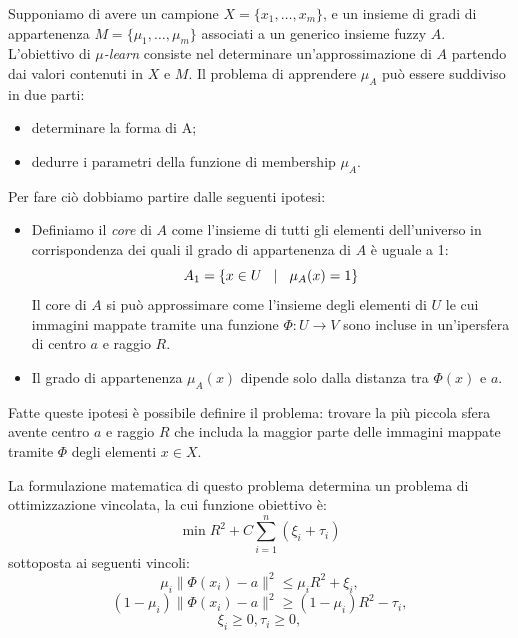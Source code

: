 \documentclass[a4paper,12pt]{report}
\begin{document}
Supponiamo di avere un campione $X = \{x_1,\dots,x_m\}$, e un insieme di gradi di appartenenza $ M = \{\mu_1,\dots,\mu_m\}$ associati a un generico insieme fuzzy $A$. L'obiettivo di \textit{$\mu$-learn} consiste nel determinare un'approssimazione di $A$ partendo dai valori contenuti in $X$ e $M$.
Il problema di apprendere $\mu_A$ può essere suddiviso in due parti:
\begin{itemize}
    \item determinare la forma di A;
    \item dedurre i parametri della funzione di membership $\mu_A$.
\end{itemize}

\noindent Per fare ciò dobbiamo partire dalle seguenti ipotesi:
\begin{itemize}
    \item  Definiamo il \textit{core} di $A$ come l'insieme di tutti gli elementi dell'universo in corrispondenza dei quali il grado di appartenenza di $A$ è uguale a 1:
    \begin{equation}
        A_1 = \{ x\in U \hspace{0,3cm} |\hspace{0,3cm} \mu_A(x) = 1 \}
    \end{equation}
    \noindent Il core di $A$ si può approssimare come l'insieme degli elementi di $U$ le cui immagini mappate tramite una funzione $\Phi: U \to V$ sono incluse in un'ipersfera di centro $a$ e raggio $R$.

    \item Il grado di appartenenza $\mu_A(x)$ dipende solo dalla distanza tra $\Phi(x)$ e $a$.
\end{itemize}

\noindent Fatte queste ipotesi è possibile definire il problema: trovare la più piccola sfera avente centro $a$ e raggio $R$ che includa la maggior parte delle immagini mappate tramite $\Phi$ degli elementi $x\in X$.



La formulazione matematica di questo problema determina un problema di ottimizzazione vincolata, la cui funzione obiettivo è:
\begin{equation}
    \min R^2 + C\displaystyle\sum_{i=1}^{n}(\xi_i+\tau_i)
    \label{eq:Problema_di_partenza}
\end{equation}
sottoposta ai seguenti vincoli:
\begin{equation}
    \mu_i\|\Phi(x_i)-a\|^2\le\mu_iR^2 + \xi_i,
    \label{eq:vincolo_1}
\end{equation}
\begin{equation}
    (1-\mu_i)\|\Phi(x_i)-a\|^2 \ge (1-\mu_i)R^2 - \tau_i,
    \label{eq:vincolo_2}
\end{equation}
\begin{equation}
    \xi_i \ge 0, \tau_i \ge 0,
    \label{eq:vincolo_3}
\end{equation}
\end{document}
